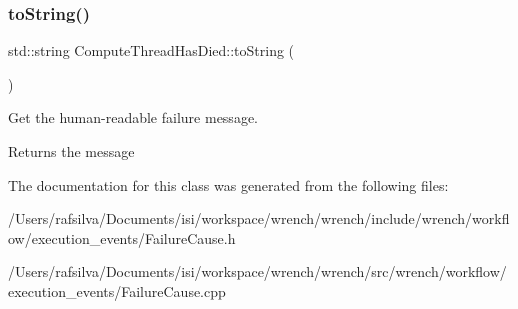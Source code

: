 \subsubsection{\texorpdfstring{to\+String()}{toString()}}
{\footnotesize\ttfamily std\+::string Compute\+Thread\+Has\+Died\+::to\+String (\begin{DoxyParamCaption}{ }\end{DoxyParamCaption})}



Get the human-\/readable failure message. 

\begin{DoxyReturn}{Returns}
the message 
\end{DoxyReturn}


The documentation for this class was generated from the following files\+:\begin{DoxyCompactItemize}
\item 
/\+Users/rafsilva/\+Documents/isi/workspace/wrench/wrench/include/wrench/workflow/execution\+\_\+events/Failure\+Cause.\+h\item 
/\+Users/rafsilva/\+Documents/isi/workspace/wrench/wrench/src/wrench/workflow/execution\+\_\+events/Failure\+Cause.\+cpp\end{DoxyCompactItemize}
